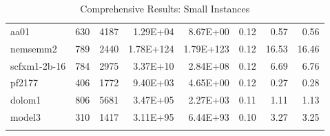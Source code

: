 \documentclass[10pt]{article}
\begin{document}
\begin{longtable}{|l|r|r|r|r|r|r|r|}
aa01	&	630	&	4187	&	1.29E+04	&	8.67E+00	&	0.12	&	0.57	&	0.56	\\
nemsemm2	&	789	&	2440	&	1.78E+124	&	1.79E+123	&	0.12	&	16.53	&	16.46	\\
scfxm1-2b-16	&	784	&	2975	&	3.37E+10	&	2.84E+08	&	0.12	&	6.69	&	6.76	\\
pf2177	&	406	&	1772	&	9.40E+03	&	4.65E+00	&	0.12	&	0.27	&	0.28	\\
dolom1	&	806	&	5681	&	3.47E+05	&	2.27E+03	&	0.11	&	1.11	&	1.13	\\
model3	&	310	&	1417	&	3.11E+95	&	6.44E+93	&	0.10	&	3.27	&	3.25	\\
\hline
\caption{Comprehensive Results: Small Instances}
\small
\centering
\label{supptab:all_small}
\end{longtable}
\end{document}
